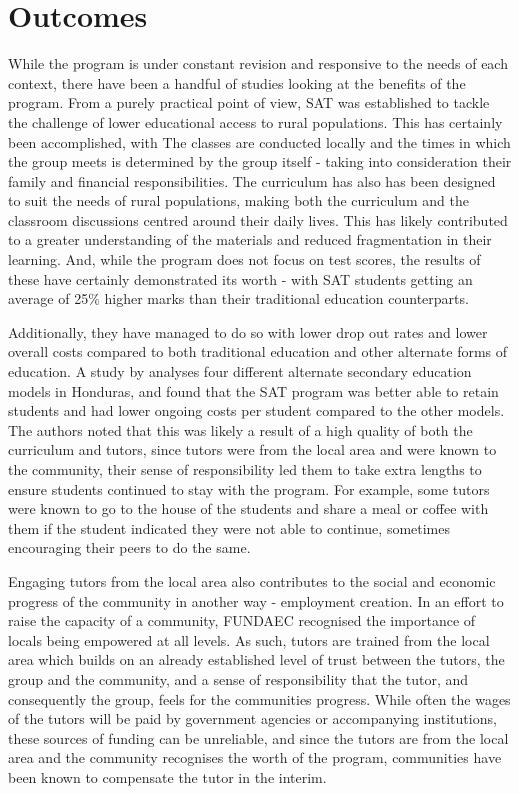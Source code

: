  \section{Outcomes}
 
 While the program is under constant revision and responsive to the needs of each context, there have been a handful of studies looking at the benefits of the program. From a purely practical point of view, SAT was established to tackle the challenge of lower educational access to rural populations. This has certainly been accomplished, with %
The classes are conducted locally and the times in which the group meets is determined by the group itself - taking into consideration their family and financial responsibilities. The curriculum has also has been designed to suit the needs of rural populations, making both the curriculum and the classroom discussions centred around their daily lives. This has likely contributed to a greater understanding of the materials and reduced fragmentation in their learning. And, while the program does not focus on test scores, the results of these have certainly demonstrated its worth - with SAT students getting an average of 25\% higher marks than their traditional education counterparts. 

Additionally, they have managed to do so with lower drop out rates and lower overall costs compared to both traditional education and other alternate forms of education. A study by \citet{Marshall2014} analyses four different alternate secondary education models in Honduras, and found that the SAT program was better able to retain students and had lower ongoing costs per student compared to the other models. The authors noted that this was likely a result of a high quality of both the curriculum and tutors, since tutors were from the local area and were known to the community, their sense of responsibility led them to take extra lengths to ensure students continued to stay with the program. For example, some tutors were known to go to the house of the students and share a meal or coffee with them if the student indicated they were not able to continue, sometimes encouraging their peers to do the same. 

Engaging tutors from the local area also contributes to the social and economic progress of the community in another way - employment creation. In an effort to raise the capacity of a community, FUNDAEC recognised the importance of locals being empowered at all levels. As such, tutors are trained from the local area which builds on an already established level of trust between the tutors, the group and the community, and a sense of responsibility that the tutor, and consequently the group, feels for the communities progress. While often the wages of the tutors will be paid by government agencies or accompanying institutions, these sources of funding can be unreliable, and since the tutors are from the local area and the community recognises the worth of the program, communities have been known to compensate the tutor in the interim. 

